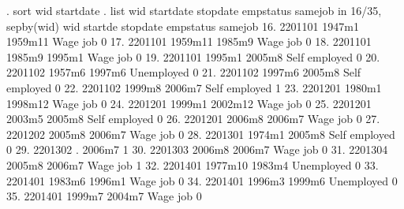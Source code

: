 . sort wid startdate
{\smallskip}
. list wid startdate stopdate empstatus samejob in 16/35, sepby(wid)
{\smallskip}
     {\TLC}
     {\VBAR}     wid   startd{\tytilde}e   stopdate       empstatus   samejob {\VBAR}
     {\LFTT}
 16. {\VBAR} 2201101     1947m1    1959m11        Wage job         0 {\VBAR}
 17. {\VBAR} 2201101    1959m11     1985m9        Wage job         0 {\VBAR}
 18. {\VBAR} 2201101     1985m9     1995m1        Wage job         0 {\VBAR}
 19. {\VBAR} 2201101     1995m1     2005m8   Self employed         0 {\VBAR}
     {\LFTT}
 20. {\VBAR} 2201102     1957m6     1997m6      Unemployed         0 {\VBAR}
 21. {\VBAR} 2201102     1997m6     2005m8   Self employed         0 {\VBAR}
 22. {\VBAR} 2201102     1999m8     2006m7   Self employed         1 {\VBAR}
     {\LFTT}
 23. {\VBAR} 2201201     1980m1    1998m12        Wage job         0 {\VBAR}
 24. {\VBAR} 2201201     1999m1    2002m12        Wage job         0 {\VBAR}
 25. {\VBAR} 2201201     2003m5     2005m8   Self employed         0 {\VBAR}
 26. {\VBAR} 2201201     2006m8     2006m7        Wage job         0 {\VBAR}
     {\LFTT}
 27. {\VBAR} 2201202     2005m8     2006m7        Wage job         0 {\VBAR}
     {\LFTT}
 28. {\VBAR} 2201301     1974m1     2005m8   Self employed         0 {\VBAR}
     {\LFTT}
 29. {\VBAR} 2201302          .     2006m7                         1 {\VBAR}
     {\LFTT}
 30. {\VBAR} 2201303     2006m8     2006m7        Wage job         0 {\VBAR}
     {\LFTT}
 31. {\VBAR} 2201304     2005m8     2006m7        Wage job         1 {\VBAR}
     {\LFTT}
 32. {\VBAR} 2201401    1977m10     1983m4      Unemployed         0 {\VBAR}
 33. {\VBAR} 2201401     1983m6     1996m1        Wage job         0 {\VBAR}
 34. {\VBAR} 2201401     1996m3     1999m6      Unemployed         0 {\VBAR}
 35. {\VBAR} 2201401     1999m7     2004m7        Wage job         0 {\VBAR}
     {\BLC}
